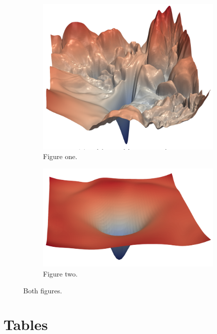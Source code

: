 \documentclass{article} %
\begin{document}
\begin{figure}[H]
	\centering
	\begin{subfigure}{2in}
		\includegraphics[width=1\textwidth]{images/mse-visu-1}
		\caption{Figure one.}
		\label{fig:mse-visu-1}
	\end{subfigure}	
	\begin{subfigure}{2in}
		\includegraphics[width=1\textwidth]{images/mse-visu-2}
		\caption{Figure two.}
		\label{fig:mse-visu-2}
	\end{subfigure}
	\caption{Both figures.}
\label{fig:mse-visu-12}
\end{figure}

\section{Tables}
\end{document}
